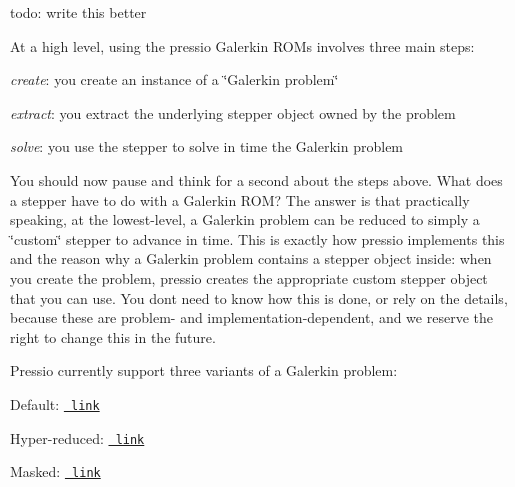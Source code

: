 todo\+: write this better

At a high level, using the pressio Galerkin ROMs involves three main steps\+:


\begin{DoxyEnumerate}
\item {\itshape create}\+: you create an instance of a \char`\"{}\+Galerkin problem\char`\"{}
\item {\itshape extract}\+: you extract the underlying stepper object owned by the problem
\item {\itshape solve}\+: you use the stepper to solve in time the Galerkin problem
\end{DoxyEnumerate}

You should now pause and think for a second about the steps above. What does a stepper have to do with a Galerkin ROM? The answer is that practically speaking, at the lowest-\/level, a Galerkin problem can be reduced to simply a \char`\"{}custom\char`\"{} stepper to advance in time. This is exactly how pressio implements this and the reason why a Galerkin problem contains a stepper object inside\+: when you create the problem, pressio creates the appropriate custom stepper object that you can use. You don\textquotesingle{}t need to know how this is done, or rely on the details, because these are problem-\/ and implementation-\/dependent, and we reserve the right to change this in the future.

Pressio currently support three variants of a Galerkin problem\+:


\begin{DoxyItemize}
\item Default\+: \href{md_pages_components_rom_galerkin_default.html}{\texttt{ link}}
\item Hyper-\/reduced\+: \href{md_pages_components_rom_galerkin_hypred.html}{\texttt{ link}}
\item Masked\+: \href{md_pages_components_rom_galerkin_masked.html}{\texttt{ link}} 
\end{DoxyItemize}